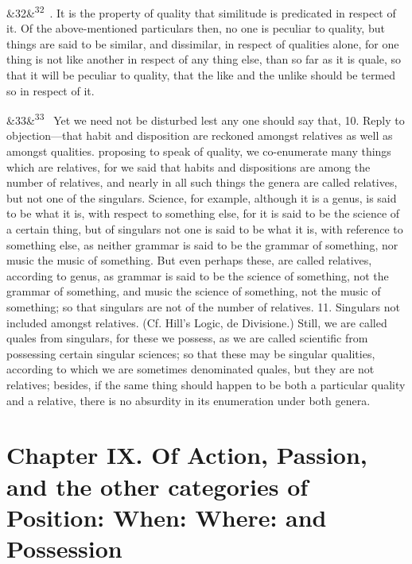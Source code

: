 \documentclass[12pt]{article}
\newcommand{\para}[1][]{\par\noindent\ifx&#1&\else\textsuperscript{\footnotesize #1}~\fi}
\begin{document}
\para[32] 9. It is the property of quality that similitude is predicated in respect of it. Of the above-mentioned particulars then, no one is peculiar to quality, but things are said to be similar, and dissimilar, in respect of qualities alone, for one thing is not like another in respect of any thing else, than so far as it is quale, so that it will be peculiar to quality, that the like and the unlike should be termed so in respect of it.

\para[33] Yet we need not be disturbed lest any one should say that, 10. Reply to objection---that habit and disposition are reckoned amongst relatives as well as amongst qualities. proposing to speak of quality, we co-enumerate many things which are relatives, for we said that habits and dispositions are among the number of relatives, and nearly in all such things the genera are called relatives, but not one of the singulars. Science, for example, although it is a genus, is said to be what it is, with respect to something else, for it is said to be the science of a certain thing, but of singulars not one is said to be what it is, with reference to something else, as neither grammar is said to be the grammar of something, nor music the music of something. But even perhaps these, are called relatives, according to genus, as grammar is said to be the science of something, not the grammar of something, and music the science of something, not the music of something; so that singulars are not of the number of relatives. 11. Singulars not included amongst relatives. (Cf. Hill's Logic, de Divisione.) Still, we are called quales from singulars, for these we possess, as we are called scientific from possessing certain singular sciences; so that these may be singular qualities, according to which we are sometimes denominated quales, but they are not relatives; besides, if the same thing should happen to be both a particular quality and a relative, there is no absurdity in its enumeration under both genera.

\section*{Chapter IX. Of Action, Passion, and the other categories of Position: When: Where: and Possession}
\end{document}
